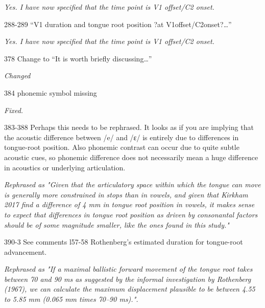 \documentclass[]{article}
\begin{document}
\begin{adjustwidth}{1cm}{} \textit{
Yes. I have now specified that the time point is V1 offset/C2 onset.
} \end{adjustwidth}

288-289 ``V1 duration and tongue root position ?at
V1offset/C2onset?\ldots{}''

\begin{adjustwidth}{1cm}{} \textit{
Yes. I have now specified that the time point is V1 offset/C2 onset.
} \end{adjustwidth}

378 Change to ``It is worth briefly discussing\ldots{}''

\begin{adjustwidth}{1cm}{} \textit{
Changed
} \end{adjustwidth}

384 phonemic symbol missing

\begin{adjustwidth}{1cm}{} \textit{
Fixed.
} \end{adjustwidth}

383-388 Perhaps this needs to be rephrased. It looks as if you are
implying that the acoustic difference between /e/ and /ɛ/ is entirely
due to differences in tongue-root position. Also phonemic contrast can
occur due to quite subtle acoustic cues, so phonemic difference does not
necessarily mean a huge difference in acoustics or underlying
articulation.

\begin{adjustwidth}{1cm}{} \textit{
Rephrased as "Given that the articulatory space within which the tongue can move is generally more constrained in stops than in vowels, and given that Kirkham 2017 find a difference of 4 mm in tongue root position in vowels, it makes sense to expect that differences in tongue root position as driven by consonantal factors should be of some magnitude smaller, like the ones found in this study."
} \end{adjustwidth}

390-3 See comments l57-58 Rothenberg's estimated duration for
tongue-root advancement.

\begin{adjustwidth}{1cm}{} \textit{
Rephrased as "If a maximal ballistic forward movement of the tongue root takes between 70 and 90 ms as suggested by the informal investigation by Rothenberg (1967), we can calculate the maximum displacement plausible to be between 4.55 to 5.85 mm (0.065 mm times 70–90 ms).".
} \end{adjustwidth}
\end{document}
